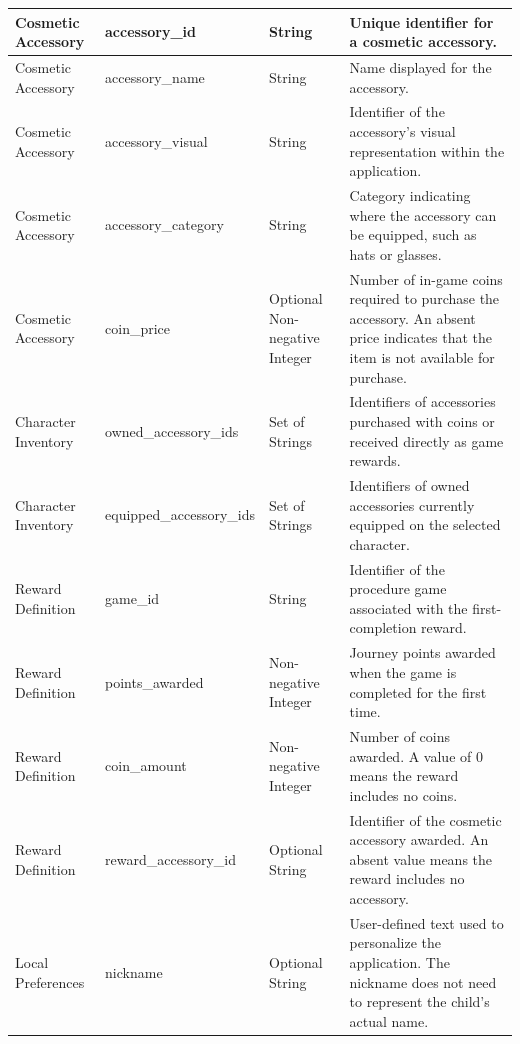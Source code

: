 \documentclass[10pt]{article}
\begin{document}
\begin{longtable}{
    p{}
    p{}
    p{}
    p{}
}
Cosmetic Accessory &
accessory\_id &
String &
Unique identifier for a cosmetic accessory. \\
\midrule

Cosmetic Accessory &
accessory\_name &
String &
Name displayed for the accessory. \\
\midrule

Cosmetic Accessory &
accessory\_visual &
String &
Identifier of the accessory's visual representation
within the application. \\
\midrule

Cosmetic Accessory &
accessory\_category &
String &
Category indicating where the accessory can
be equipped, such as hats or glasses. \\
\midrule

Cosmetic Accessory &
coin\_price &
Optional Non-negative Integer &
Number of in-game coins required to purchase
the accessory. An absent price indicates that
the item is not available for purchase. \\
\midrule

Character Inventory &
owned\_accessory\_ids &
Set of Strings &
Identifiers of accessories purchased with coins
or received directly as game rewards. \\
\midrule

Character Inventory &
equipped\_\allowbreak accessory\_ids &
Set of Strings &
Identifiers of owned accessories currently
equipped on the selected character. \\
\midrule

Reward Definition &
game\_id &
String &
Identifier of the procedure game associated
with the first-completion reward. \\
\midrule

Reward Definition &
points\_awarded &
Non-negative Integer &
Journey points awarded when the game is
completed for the first time. \\
\midrule

Reward Definition &
coin\_amount &
Non-negative Integer &
Number of coins awarded. A value of 0 means the
reward includes no coins. \\
\midrule

Reward Definition &
reward\_accessory\_id &
Optional String &
Identifier of the cosmetic accessory awarded. An
absent value means the reward includes no accessory. \\
\midrule

Local Preferences &
nickname &
Optional String &
User-defined text used to personalize the
application. The nickname does not need to
represent the child's actual name. \\
\midrule


\end{longtable}
\end{document}
